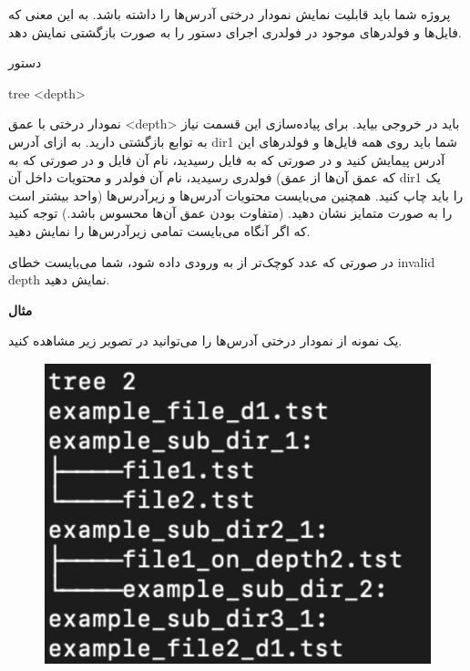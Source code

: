 \documentclass[]{article}
\begin{document}
پروژه شما باید قابلیت نمایش نمودار درختی آدرس‌ها را داشته باشد. به این معنی که فایل‌ها و فولدر‌های موجود در فولدر‌ی اجرای دستور را به صورت بازگشتی نمایش دهد.

\begin{mybox}[colback=yellow]{دستور}
	\begin{latin}	
		tree <depth>
	\end{latin}
\end{mybox}

نمودار درختی با عمق <depth> باید در خروجی بیاید. برای پیاده‌سازی این قسمت نیاز به توابع بازگشتی دارید. به ازای آدرس dir1 شما باید روی همه فایل‌ها و فولدر‌های این آدرس پیمایش کنید و در صورتی که به فایل رسیدید، نام آن فایل و در صورتی که به فولدر‌ی رسیدید، نام آن فولدر و محتویات داخل آن (که عمق آن‌ها از عمق dir1 یک واحد بیشتر است) را باید چاپ کنید. همچنین می‌بایست محتویات آدرس‌ها و زیرآدرس‌ها را به صورت متمایز نشان دهید. (متفاوت بودن عمق آن‌ها محسوس باشد.) توجه کنید که اگر  آنگاه می‌بایست تمامی زیرآدرس‌ها را نمایش دهید.

در صورتی که عدد کوچک‌تر از  به ورودی داده شود، شما می‌بایست خطای invalid depth نمایش دهید.

\newpage
\textbf{مثال}

یک نمونه از نمودار درختی آدرس‌ها را می‌توانید در تصویر زیر مشاهده کنید.

\begin{figure}[H]
    \centerline{\includegraphics[scale=0.8]{Resources/tree.png}}
\end{figure}
\end{document}
